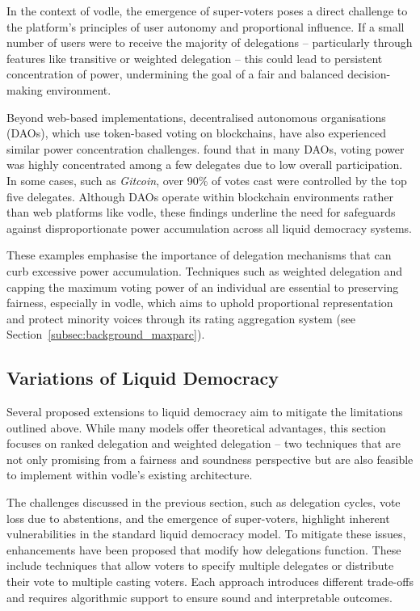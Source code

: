 In the context of vodle, the emergence of super-voters poses a direct challenge to the platform's principles of user autonomy and proportional influence. If a small number of users were to receive the majority of delegations -- particularly through features like transitive or weighted delegation -- this could lead to persistent concentration of power, undermining the goal of a fair and balanced decision-making environment.

Beyond web-based implementations, decentralised autonomous organisations (DAOs), which use token-based voting on blockchains, have also experienced similar power concentration challenges. \citet{hallWhatHappensWhen2024} found that in many DAOs, voting power was highly concentrated among a few delegates due to low overall participation. In some cases, such as \textit{Gitcoin}, over 90\% of votes cast were controlled by the top five delegates. Although DAOs operate within blockchain environments rather than web platforms like vodle, these findings underline the need for safeguards against disproportionate power accumulation across all liquid democracy systems.

These examples emphasise the importance of delegation mechanisms that can curb excessive power accumulation. Techniques such as weighted delegation and capping the maximum voting power of an individual are essential to preserving fairness, especially in vodle, which aims to uphold proportional representation and protect minority voices through its rating aggregation system (see Section~\ref{subsec:background_maxparc}).

\subsection{Variations of Liquid Democracy}
Several proposed extensions to liquid democracy aim to mitigate the limitations outlined above. While many models offer theoretical advantages, this section focuses on ranked delegation and weighted delegation -- two techniques that are not only promising from a fairness and soundness perspective but are also feasible to implement within vodle's existing architecture.

The challenges discussed in the previous section, such as delegation cycles, vote loss due to abstentions, and the emergence of super-voters, highlight inherent vulnerabilities in the standard liquid democracy model. To mitigate these issues, enhancements have been proposed that modify how delegations function. These include techniques that allow voters to specify multiple delegates or distribute their vote to multiple casting voters. Each approach introduces different trade-offs and requires algorithmic support to ensure sound and interpretable outcomes.

